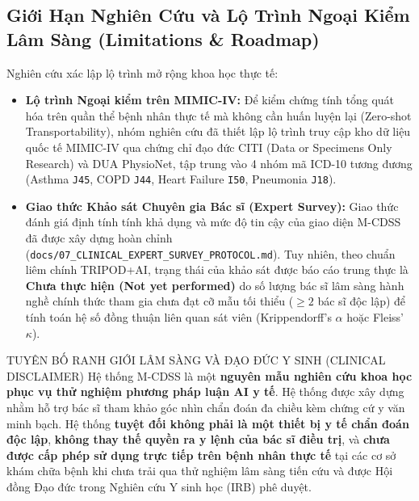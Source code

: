 \subsection{Giới Hạn Nghiên Cứu và Lộ Trình Ngoại Kiểm Lâm Sàng (Limitations \& Roadmap)}
Nghiên cứu xác lập lộ trình mở rộng khoa học thực tế:
\begin{itemize}[leftmargin=1.8em, itemsep=0.2em]
    \item \textbf{Lộ trình Ngoại kiểm trên MIMIC-IV:} Để kiểm chứng tính tổng quát hóa trên quần thể bệnh nhân thực tế mà không cần huấn luyện lại (Zero-shot Transportability), nhóm nghiên cứu đã thiết lập lộ trình truy cập kho dữ liệu quốc tế MIMIC-IV \cite{johnson2023mimiciv} qua chứng chỉ đạo đức CITI (Data or Specimens Only Research) và DUA PhysioNet, tập trung vào 4 nhóm mã ICD-10 tương đương (Asthma \texttt{J45}, COPD \texttt{J44}, Heart Failure \texttt{I50}, Pneumonia \texttt{J18}).
    \item \textbf{Giao thức Khảo sát Chuyên gia Bác sĩ (Expert Survey):} Giao thức đánh giá định tính tính khả dụng và mức độ tin cậy của giao diện M-CDSS đã được xây dựng hoàn chỉnh (\texttt{docs/07\_CLINICAL\_EXPERT\_SURVEY\_PROTOCOL.md}). Tuy nhiên, theo chuẩn liêm chính TRIPOD+AI, trạng thái của khảo sát được báo cáo trung thực là \textbf{Chưa thực hiện (Not yet performed)} do số lượng bác sĩ lâm sàng hành nghề chính thức tham gia chưa đạt cỡ mẫu tối thiểu ($\ge 2$ bác sĩ độc lập) để tính toán hệ số đồng thuận liên quan sát viên (Krippendorff's $\alpha$ hoặc Fleiss' $\kappa$).
\end{itemize}

\begin{clinicalbox}{TUYÊN BỐ RANH GIỚI LÂM SÀNG VÀ ĐẠO ĐỨC Y SINH (CLINICAL DISCLAIMER)}
Hệ thống M-CDSS là một \textbf{nguyên mẫu nghiên cứu khoa học phục vụ thử nghiệm phương pháp luận AI y tế}. Hệ thống được xây dựng nhằm hỗ trợ bác sĩ tham khảo góc nhìn chẩn đoán đa chiều kèm chứng cứ y văn minh bạch. Hệ thống \textbf{tuyệt đối không phải là một thiết bị y tế chẩn đoán độc lập}, \textbf{không thay thế quyền ra y lệnh của bác sĩ điều trị}, và \textbf{chưa được cấp phép sử dụng trực tiếp trên bệnh nhân thực tế} tại các cơ sở khám chữa bệnh khi chưa trải qua thử nghiệm lâm sàng tiến cứu và được Hội đồng Đạo đức trong Nghiên cứu Y sinh học (IRB) phê duyệt.
\end{clinicalbox}

